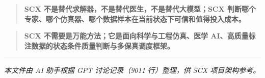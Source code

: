 \documentclass[
  12pt,
]{ctexart}
\begin{document}
\begin{quote}
\textbf{SCX 不是替代求解器，不是替代医生，不是替代大模型；SCX
判断哪个专家、哪个仿真器、哪个数据样本在当前状态下可信和值得投入成本。}
\end{quote}

\begin{quote}
\textbf{SCX 不需要是万能方法；它是面向科学与工程仿真、医学
AI、高质量标注数据的状态条件质量判断与多保真调度框架。}
\end{quote}

\begin{center}\rule{0.5\linewidth}{0.5pt}\end{center}

\emph{本文件由 AI 助手根据 GPT 讨论记录（9011 行）整理，供 SCX
项目架构参考。}
\end{document}
